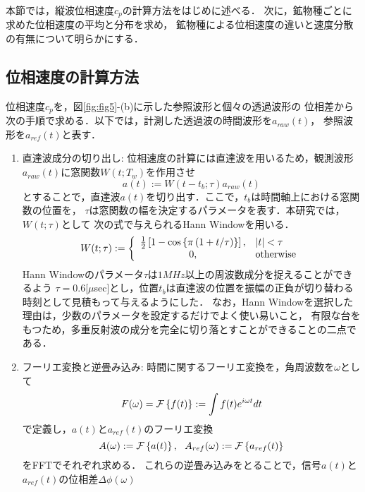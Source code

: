 ﻿本節では，縦波位相速度$c_p$の計算方法をはじめに述べる．
次に，鉱物種ごとに求めた位相速度の平均と分布を求め，
鉱物種による位相速度の違いと速度分散の有無について明らかにする．
\subsection{位相速度の計算方法}
位相速度$c_p$を，図\ref{fig:fig5}-(b)に示した参照波形と個々の透過波形の
位相差から次の手順で求める．以下では，計測した透過波の時間波形を$a_{raw}(t)$，
参照波形を$a_{ref}(t)$と表す．
\begin{enumerate}
\item
直達波成分の切り出し: 
位相速度の計算には直達波を用いるため，観測波形$a_{raw}(t)$に窓関数$W(t;T_w)$を作用させ
\begin{equation}
	a(t):=W(t-t_b;\tau)a_{raw}(t)
\end{equation}
とすることで，直達波$a(t)$を切り出す．ここで，$t_b$は時間軸上における窓関数の位置を，
$\tau$は窓関数の幅を決定するパラメータを表す．本研究では，$W(t;\tau)$として
次の式で与えられるHann Windowを用いる．
\begin{equation}
	W(t;\tau):=\left\{
	\begin{array}{cl}
		\frac{1}{2}\left[ 1-\cos \left\{ \pi\left(1+t/\tau \right) \right\} \right],
		 & \left| t \right| < \tau \\
		0, & {\rm otherwise}
	\end{array}
	\right.
\end{equation}
Hann Windowのパラメータ$\tau$は$1MHz$以上の周波数成分を捉えることができるよう
$\tau=0.6$[$\mu$sec]とし，位置$t_b$は直達波の位置を振幅の正負が切り替わる
時刻として見積もって与えるようにした．
なお，Hann Windowを選択した理由は，少数のパラメータを設定するだけでよく使い易いこと，
有限な台をもつため，多重反射波の成分を完全に切り落とすことができることの二点である．
\item
フーリエ変換と逆畳み込み:
時間に関するフーリエ変換を，角周波数を$\omega$として
	\begin{equation}
		F(\omega) ={\cal F} \left\{ f(t)\right\}:=\int f(t) e^{i\omega t}dt 
		\label{eqn:Fourier}
	\end{equation}
で定義し，$a(t)$と$a_{ref}(t)$のフーリエ変換
	\begin{equation}
		A(\omega):={\cal F} \left\{ a(t) \right\}, \ \ 
		A_{ref}(\omega):={\cal F} \left\{ a_{ref} (t)\right\}
	\end{equation}
をFFTでそれぞれ求める．
これらの逆畳み込みをとることで，信号$a(t)$と$a_{ref}(t)$の位相差$\Delta \phi(\omega)$

\end{enumerate}

